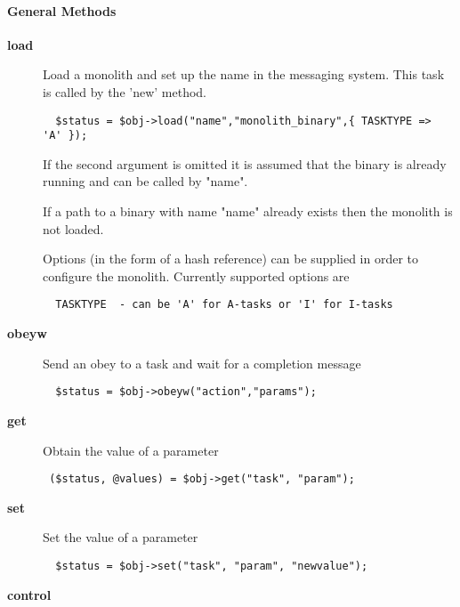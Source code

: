 \paragraph*{General Methods\label{ORAC::Msg::Task::ADAM_General_Methods}}\begin{description}
\item[\textbf{load}] \mbox{}

Load a monolith and set up the name in the messaging system.
This task is called by the 'new' method.

\begin{verbatim}
  $status = $obj->load("name","monolith_binary",{ TASKTYPE => 'A' });
\end{verbatim}


If the second argument is omitted it is assumed that the binary
is already running and can be called by "name".



If a path to a binary with name "name" already exists then the monolith
is not loaded.



Options (in the form of a hash reference) can be supplied
in order to configure the monolith. Currently supported options
are

\begin{verbatim}
  TASKTYPE  - can be 'A' for A-tasks or 'I' for I-tasks
\end{verbatim}
\item[\textbf{obeyw}] \mbox{}

Send an obey to a task and wait for a completion message

\begin{verbatim}
  $status = $obj->obeyw("action","params");
\end{verbatim}
\item[\textbf{get}] \mbox{}

Obtain the value of a parameter

\begin{verbatim}
 ($status, @values) = $obj->get("task", "param");
\end{verbatim}
\item[\textbf{set}] \mbox{}

Set the value of a parameter

\begin{verbatim}
  $status = $obj->set("task", "param", "newvalue");
\end{verbatim}
\item[\textbf{control}] \mbox{}


\end{description}
